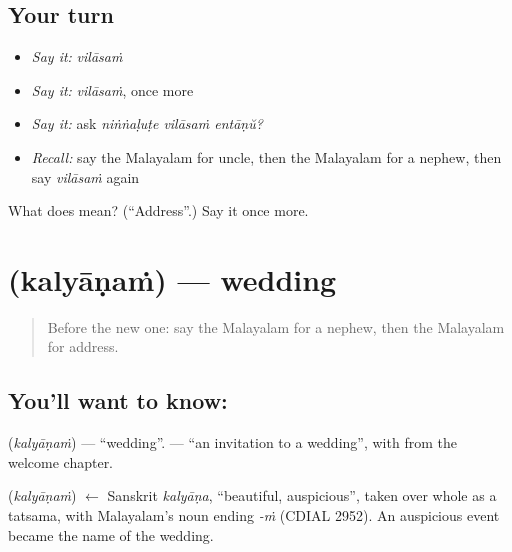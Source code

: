 \subsection*{Your turn}
\begin{itemize}
\raggedright
  \item \emph{Say it:} \emph{vilāsaṁ}
  \item \emph{Say it:} \emph{vilāsaṁ}, once more
  \item \emph{Say it:} ask \emph{niṅṅaḷuṭe vilāsaṁ entāṇŭ?}
  \item \emph{Recall:} say the Malayalam for uncle, then the Malayalam for a nephew, then say \emph{vilāsaṁ} again
\end{itemize}

\begin{tcolorbox}[breakable,colback=teal!4,colframe=teal!35!black,title={Before you move on}]
What does  mean? (\textquotedblleft{}Address\textquotedblright{}.) Say it once more.
\end{tcolorbox}
\section[\texorpdfstring{\ml{കല്യാണം} (kalyāṇaṁ)}{കല്യാണം (kalyāṇaṁ)}]{ (kalyāṇaṁ) — wedding}

\label{lesson:ML-C126-wedding}



\begin{quote}
Before the new one: say the Malayalam for a nephew, then the Malayalam for address.
\end{quote}

\subsection*{You'll want to know: }
\textbf{} (\emph{kalyāṇaṁ}) — \textquotedblleft{}wedding\textquotedblright{}. \textbf{ } — \textquotedblleft{}an invitation to a wedding\textquotedblright{}, with \textbf{} from the welcome chapter.

\begin{cousinweb}
\textbf{} (\emph{kalyāṇaṁ}) $\leftarrow$ Sanskrit \emph{kalyāṇa}, \textquotedblleft{}beautiful, auspicious\textquotedblright{}, taken over whole as a tatsama, with Malayalam's noun ending \emph{-ṁ} (CDIAL 2952). An auspicious event became the name of the wedding.
\end{cousinweb}

